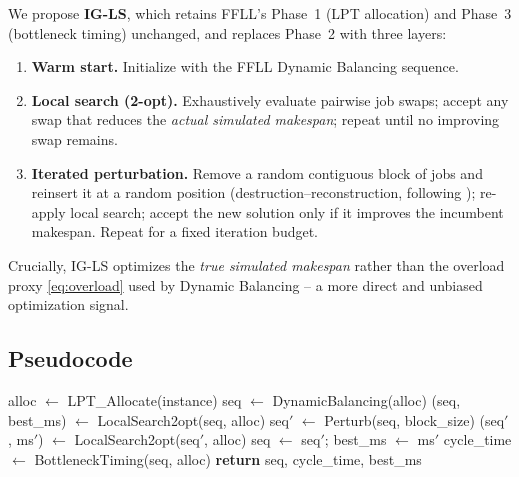 \documentclass[11pt,a4paper]{article}
\begin{document}
We propose \textbf{IG-LS}, which retains FFLL's Phase~1 (LPT allocation)
and Phase~3 (bottleneck timing) unchanged, and replaces Phase~2 with three
layers:

\begin{enumerate}
  \item \textbf{Warm start.} Initialize with the FFLL Dynamic Balancing
    sequence.
  \item \textbf{Local search (2-opt).} Exhaustively evaluate pairwise job
    swaps; accept any swap that reduces the \emph{actual simulated
    makespan}; repeat until no improving swap remains.
  \item \textbf{Iterated perturbation.} Remove a random contiguous block of
    jobs and reinsert it at a random position (destruction--reconstruction,
    following \citet{ruiz2007simple}); re-apply local search; accept the
    new solution only if it improves the incumbent makespan. Repeat for a
    fixed iteration budget.
\end{enumerate}

Crucially, IG-LS optimizes the \emph{true simulated makespan} rather than
the overload proxy \eqref{eq:overload} used by Dynamic Balancing -- a
more direct and unbiased optimization signal.

\subsection{Pseudocode}

\begin{algorithm}[h!]
\caption{IG-LS: Iterated Greedy with Local Search}
\begin{algorithmic}[1]
  \State alloc $\gets$ LPT\_Allocate(instance) 
  \State seq $\gets$ DynamicBalancing(alloc) 
  \State (seq, best\_ms) $\gets$ LocalSearch2opt(seq, alloc)
    \State seq$'$ $\gets$ Perturb(seq, block\_size) 
    \State (seq$'$, ms$'$) $\gets$ LocalSearch2opt(seq$'$, alloc)
      \State seq $\gets$ seq$'$; \quad best\_ms $\gets$ ms$'$
    \EndIf
  \EndFor
  \State cycle\_time $\gets$ BottleneckTiming(seq, alloc) 
  \State \textbf{return} seq, cycle\_time, best\_ms
\EndProcedure
\end{algorithmic}
\end{algorithm}
\end{document}
